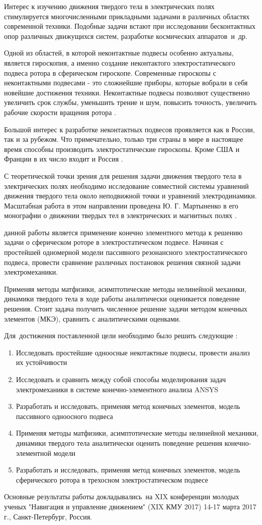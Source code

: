 
{\actuality}
Интерес к изучению движения твердого тела в электрических полях стимулируется многочисленными прикладными задачами в различных областях современной техники. Подобные задачи встают при исследовании бесконтактных опор различных движущихся систем, разработке космических аппаратов~и~др.

Одной из областей, в которой неконтактные подвесы особенно актуальны, является гироскопия, а именно создание неконтактого электростатического подвеса ротора в сферическом гироскопе. Современные гироскопы с неконтактными подвесами - это сложнейшие приборы, которые вобрали в себя новейшие достижения техники. Неконтактные подвесы позволяют существенно увеличить срок службы, уменьшить трение и шум, повысить точность, увеличить рабочие скорости вращения ротора \cite{Electropribor}.

Большой интерес к разработке неконтактных подвесов проявляется как в России, так и за рубежом. Что примечательно, только три страны в мире в настоящее время способны производить электростатические гироскопы. Кроме США и Франции в их число входит и Россия \cite{Electropribor}.

С теоретической точки зрения для решения задачи движения твердого тела в электрических полях необходимо исследование совместной системы уравнений движения твердого тела около неподвижной точки и уравнений электродинамики. Масштабная работа в этом направлении проведена Ю. Г. Мартыненко в его монографии о движении твердых тел в электрических и магнитных полях \cite{Martynenko}. 


{\aim} данной работы является применение конечно элементного метода к решению задачи о сферическом роторе в электростатическом подвесе.
Начиная с простейшей одномерной модели пассивного резонансного электростатического подвеса, провести сравнение различных постановок решения связной задачи электромеханики.

Применяя методы матфизики, асимптотические методы нелинейной механики, динамики твердого тела в ходе работы аналитически оценивается поведение решения. Стоит задача получить численное решение задачи методом конечных элементов (МКЭ), сравнить с аналитическими оценками.


Для~достижения поставленной цели необходимо было решить следующие {\tasks}:
\begin{enumerate}
  \item Исследовать простейшие одноосные некотактные подвесы, провести анализ их устойчивости
  \item Исследовать и сравнить между собой способы моделирования задач электромеханики в системе конечно-элементного анализа ANSYS
  \item Разработать и исследовать, применяя метод конечных элементов,  модель пассивного одноосного подвеса
  \item Применяя методы матфизики, асимптотические методы нелинейной механики, динамики твердого тела аналитически оценить поведение решения конечно-элементной модели
  \item Разработать и исследовать, применяя метод конечных элементов,  модель сферического ротора в трехосном электростатическом подвесе 
\end{enumerate}

{\probation}
Основные результаты работы докладывались~на XIX конференции молодых ученых "Навигация и управление движением" (XIX КМУ 2017) 14-17 марта 2017 г., Санкт-Петербург, Россия.
